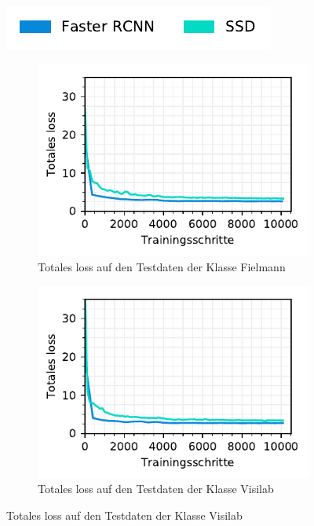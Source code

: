 \begin{figure}[h!] 
  \captionsetup{width=.9\linewidth}
  \label{fig:specific-ie:loss}
  \caption{Totales Loss auf den Testdaten der Leistungserbringer spezifischen Modelle}
  \centering
  \includegraphics[scale=1]{graphics/matplot/img-detection__legend_1.pdf}
  \begin{subfigure}[b]{0.5\linewidth}
    \captionsetup{width=.9\linewidth}
    \centering
    \includegraphics[scale=1]{graphics/matplot/img-detection__fielmann__loss.pdf}
    \caption{Totales loss auf den Testdaten der Klasse Fielmann} 
    \label{fig:specific-ie:fielmann:loss}
    \vspace{2ex}
  \end{subfigure}%
  \begin{subfigure}[b]{0.5\linewidth}
    \captionsetup{width=.9\linewidth}
    \centering
    \includegraphics[scale=1]{graphics/matplot/img-detection__visilab__loss.pdf}
    \caption{Totales loss auf den Testdaten der Klasse Visilab} 
    \label{fig:specific-ie:visilab:loss}
    \vspace{2ex}
  \end{subfigure} 
\end{figure}


